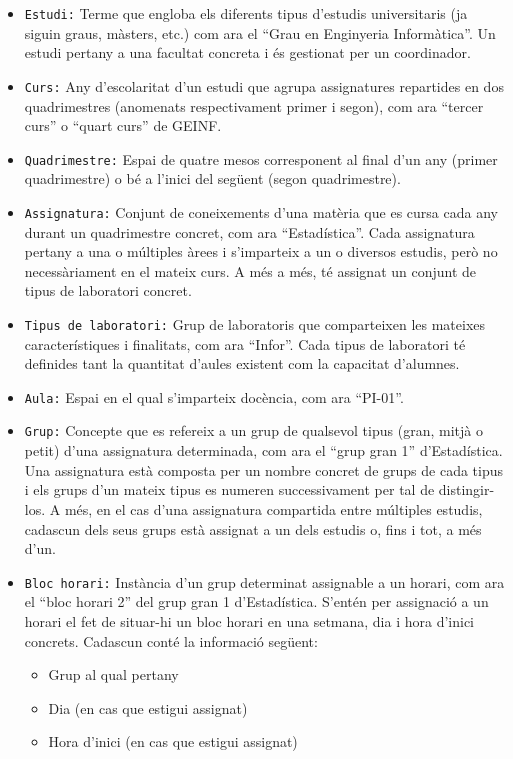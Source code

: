 \documentclass[a4paper,12pt]{ThesisStyle}
\begin{document}
\begin{itemize}
  \item \texttt{Estudi:} Terme que engloba els diferents tipus d'estudis universitaris (ja siguin graus, màsters, etc.) com ara el ``Grau en Enginyeria Informàtica''. Un estudi pertany a una facultat concreta i és gestionat per un coordinador.
  \item \texttt{Curs:} Any d'escolaritat d'un estudi que agrupa assignatures repartides en dos quadrimestres (anomenats respectivament primer i segon), com ara ``tercer curs'' o ``quart curs'' de GEINF.
  \item \texttt{Quadrimestre:} Espai de quatre mesos corresponent al final d'un any (primer quadrimestre) o bé a l'inici del següent (segon quadrimestre).
  \item \texttt{Assignatura:} Conjunt de coneixements d'una matèria que es cursa cada any durant un quadrimestre concret, com ara ``Estadística''. Cada assignatura pertany a una o múltiples àrees i s'imparteix a un o diversos estudis, però no necessàriament en el mateix curs. A més a més, té assignat un conjunt de tipus de laboratori concret.
  \item \texttt{Tipus de laboratori:} Grup de laboratoris que comparteixen les mateixes característiques i finalitats, com ara ``Infor''. Cada tipus de laboratori té definides tant la quantitat d'aules existent com la capacitat d'alumnes.
  \item \texttt{Aula:} Espai en el qual s'imparteix docència, com ara ``PI-01''.
  \item \texttt{Grup:} Concepte que es refereix a un grup de qualsevol tipus (gran, mitjà o petit) d'una assignatura determinada, com ara el ``grup gran 1'' d'Estadística. Una assignatura està composta per un nombre concret de grups de cada tipus i els grups d'un mateix tipus es numeren successivament per tal de distingir-los. A més, en el cas d'una assignatura compartida entre múltiples estudis, cadascun dels seus grups està assignat a un dels estudis o, fins i tot, a més d'un.
  \item \texttt{Bloc horari:} Instància d'un grup determinat assignable a un horari, com ara el ``bloc horari 2'' del grup gran 1 d'Estadística. S'entén per assignació a un horari el fet de situar-hi un bloc horari en una setmana, dia i hora d'inici concrets. Cadascun conté la informació següent:
  \begin{itemize}
    \item Grup al qual pertany
    \item Dia (en cas que estigui assignat)
    \item Hora d'inici (en cas que estigui assignat)

\end{itemize}
\end{itemize}
\end{document}

